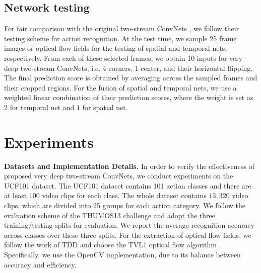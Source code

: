 \documentclass[10pt,twocolumn,letterpaper]{article}
\begin{document}
\begin{table*}
\begin{center}
\vspace{2mm}
\caption{Performance comparison of different architectures on the THUMOS15 \cite{THUMOS15} validation dataset. (from \cite{WangWXQ15}, {\bf without} using our proposed good practices)}
\label{tbl:result_thumos}
\end{center}
\end{table*}

\subsection{Network testing}

For fair comparison with the original two-stream ConvNets \cite{SimonyanZ14}, we follow their testing scheme for action recognition. At the test time, we sample 25 frame images or optical flow fields for the testing of spatial and temporal nets, respectively. From each of these selected frames, we obtain 10 inputs for very deep two-stream ConvNets, i.e. 4 corners, 1 center, and their horizontal flipping. The final prediction score is obtained by averaging across the sampled frames and their cropped regions. For the fusion of spatial and temporal nets, we use a weighted linear combination of their prediction scores, where the weight is set as $2$ for temporal net and $1$ for spatial net.

\section{Experiments}
\label{sec:experiment}

{\bf Datasets and Implementation Details.} In order to verify the effectiveness of proposed very deep two-stream ConvNets, we conduct experiments on the UCF101 \cite{Soomro12} dataset. The UCF101 dataset contains 101 action classes and there are at least 100 video clips for each class. The whole dataset contains $13,320$ video clips, which are divided into 25 groups for each action category. We follow the evaluation scheme of the THUMOS13 challenge \cite{THUMOS13} and adopt the three training/testing splits for evaluation. We report the average recognition accuracy across classes over these three splits. For the extraction of optical flow fields, we follow the work of TDD \cite{WangQT15a} and choose the TVL1 optical flow algorithm \cite{ZachPB07}. Specifically, we use the OpenCV implementation, due to its balance between accuracy and efficiency.
\end{document}
